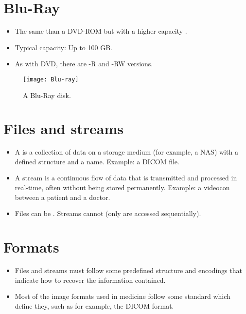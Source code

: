 \section{Blu-Ray}
\begin{itemize}
\item The same than a \gls{DVD-ROM} but with a higher capacity
  \cite{BR}.
\item Typical capacity: Up to 100 GB.
\item As with \gls{DVD}, there are -R and -RW versions.
\end{itemize}
\begin{figure}[H]
  \vspace{-16ex}
  \begin{flushright}
    \texttt{[image: Blu-ray]}
    \caption{A Blu-Ray disk.}
    \label{fig:Blu-Ray}
  \end{flushright}
\end{figure}

\section{Files and streams}
\begin{itemize}
\item A  is a collection of data  on a storage
medium (for example, a NAS) with a defined structure and a
name. Example: a DICOM file.
\item A stream is a continuous flow of data that is transmitted and
processed in real-time, often without being stored
permanently. Example: a videocon between a patient and a doctor.
\item Files can be . Streams cannot (only are accessed
sequentially).
\end{itemize}

\section{Formats}
\begin{itemize}
\item Files and streams must follow some predefined structure and
encodings that indicate how to recover the information contained.
\item Most of the image formats used in medicine follow some standard
which define they, such as for example, the DICOM format.
\end{itemize}

